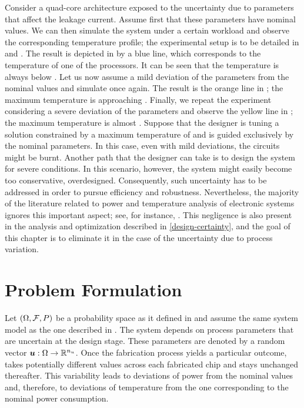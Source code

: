 Consider a quad-core architecture exposed to the uncertainty due to parameters
that affect the leakage current. Assume first that these parameters have nominal
values. We can then simulate the system under a certain workload and observe the
corresponding temperature profile; the experimental setup is to be detailed in
 and . The result is depicted in
 by a blue line, which corresponds to the temperature of
one of the processors. It can be seen that the temperature is always below
. Let us now assume a mild deviation of the parameters from the
nominal values and simulate once again. The result is the orange line in
; the maximum temperature is approaching .
Finally, we repeat the experiment considering a severe deviation of the
parameters and observe the yellow line in ; the maximum
temperature is almost . Suppose that the designer is tuning a
solution constrained by a maximum temperature of  and is guided
exclusively by the nominal parameters. In this case, even with mild deviations,
the circuits might be burnt. Another path that the designer can take is to
design the system for severe conditions. In this scenario, however, the system
might easily become too conservative, overdesigned. Consequently, such
uncertainty has to be addressed in order to pursue efficiency and robustness.
Nevertheless, the majority of the literature related to power and temperature
analysis of electronic systems ignores this important aspect; see, for instance,
\cite{rao2009, rai2011, thiele2011}. This negligence is also present in the
analysis and optimization described in \cref{design-certainty}, and the goal of
this chapter is to eliminate it in the case of the uncertainty due to process
variation.

\section{Problem Formulation}

Let $(\Omega, \mathcal{F}, \probability)$ be a probability space as it defined
in  and assume the same system model as the one
described in . The system depends on \nu process parameters
that are uncertain at the design stage. These parameters are denoted by a random
vector $\boldsymbol{u}: \Omega \to \mathbb{R}^{n_{u}}$. Once the fabrication process yields a
particular outcome, \vu takes potentially different values across each
fabricated chip and stays unchanged thereafter. This variability leads to
deviations of power from the nominal values and, therefore, to deviations of
temperature from the one corresponding to the nominal power consumption.

